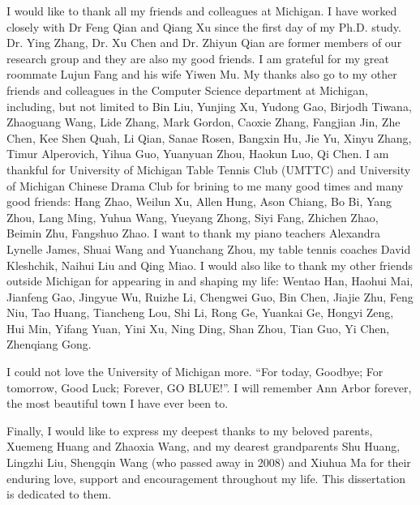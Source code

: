 I would like to thank all my friends and colleagues at Michigan. I have worked closely with Dr Feng Qian and Qiang Xu since the first day of my Ph.D. study. Dr. Ying Zhang, Dr. Xu Chen and Dr. Zhiyun Qian are former members of our research group and they are also my good friends. I am grateful for my great roommate Lujun Fang and his wife Yiwen Mu. My thanks also go to my other friends and colleagues in the Computer Science department at Michigan, including, but not limited to Bin Liu, Yunjing Xu, Yudong Gao, Birjodh Tiwana, Zhaoguang Wang, Lide Zhang, Mark Gordon, Caoxie Zhang, Fangjian Jin, Zhe Chen, Kee Shen Quah, Li Qian, Sanae Rosen, Bangxin Hu, Jie Yu, Xinyu Zhang, Timur Alperovich, Yihua Guo, Yuanyuan Zhou, Haokun Luo, Qi Chen. I am thankful for University of Michigan Table Tennis Club (UMTTC) and University of Michigan Chinese Drama Club for brining to me many good times and many good friends: Hang Zhao, Weilun Xu, Allen Hung, Ason Chiang, Bo Bi, Yang Zhou, Lang Ming, Yuhua Wang, Yueyang Zhong, Siyi Fang, Zhichen Zhao, Beimin Zhu, Fangshuo Zhao. I want to thank my piano teachers Alexandra Lynelle James, Shuai Wang and Yuanchang Zhou, my table tennis coaches David Kleshchik, Naihui Liu and Qing Miao. I would also like to thank my other friends outside Michigan for appearing in and shaping my life: Wentao Han, Haohui Mai, Jianfeng Gao, Jingyue Wu, Ruizhe Li, Chengwei Guo, Bin Chen, Jiajie Zhu, Feng Niu, Tao Huang, Tiancheng Lou, Shi Li, Rong Ge, Yuankai Ge, Hongyi Zeng, Hui Min, Yifang Yuan, Yini Xu, Ning Ding, Shan Zhou, Tian Guo, Yi Chen, Zhenqiang Gong.

I could not love the University of Michigan more. ``For today, Goodbye; For tomorrow, Good Luck; Forever, GO BLUE!''. I will remember Ann Arbor forever, the most beautiful town I have ever been to.

Finally, I would like to express my deepest thanks to my beloved parents, Xuemeng Huang and Zhaoxia Wang, and my dearest grandparents Shu Huang, Lingzhi Liu, Shengqin Wang (who passed away in 2008) and Xiuhua Ma for their enduring love, support and encouragement throughout my life. This dissertation is dedicated to them.

\label{ACKNOWLEDGEMENTS}
